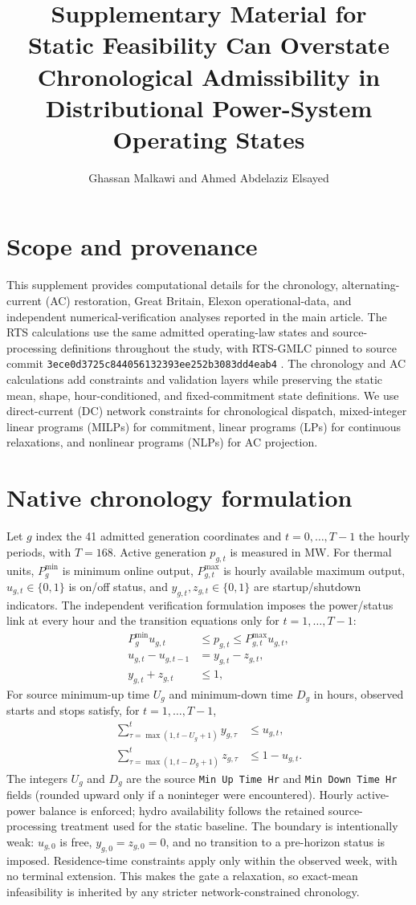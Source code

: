 \documentclass[10pt,journal,onecolumn]{IEEEtran}
\title{Supplementary Material for\\Static Feasibility Can Overstate Chronological Admissibility in Distributional Power-System Operating States}
\author{Ghassan Malkawi and Ahmed Abdelaziz Elsayed}
\begin{document}
\maketitle

\section{Scope and provenance}
This supplement provides computational details for the chronology, alternating-current (AC) restoration, Great Britain, Elexon operational-data, and independent numerical-verification analyses reported in the main article. The RTS calculations use the same admitted operating-law states and source-processing definitions throughout the study, with RTS-GMLC pinned to source commit \texttt{3ece0d3725c844056132393ee252b3083dd4eab4} \cite{Barrows2020,RTSRepo}. The chronology and AC calculations add constraints and validation layers while preserving the static mean, shape, hour-conditioned, and fixed-commitment state definitions. We use direct-current (DC) network constraints for chronological dispatch, mixed-integer linear programs (MILPs) for commitment, linear programs (LPs) for continuous relaxations, and nonlinear programs (NLPs) for AC projection.

\section{Native chronology formulation}
Let $g$ index the 41 admitted generation coordinates and $t=0,\ldots,T-1$ the hourly periods, with $T=168$. Active generation $p_{g,t}$ is measured in MW. For thermal units, $P_g^{\min}$ is minimum online output, $P_{g,t}^{\max}$ is hourly available maximum output, $u_{g,t}\in\{0,1\}$ is on/off status, and $y_{g,t},z_{g,t}\in\{0,1\}$ are startup/shutdown indicators. The independent verification formulation imposes the power/status link at every hour and the transition equations only for $t=1,\ldots,T-1$:
\begin{align}
P_g^{\min}u_{g,t}&\le p_{g,t}\le P_{g,t}^{\max}u_{g,t},\\
u_{g,t}-u_{g,t-1}&=y_{g,t}-z_{g,t},\\
y_{g,t}+z_{g,t}&\le1,
\end{align}
For source minimum-up time $U_g$ and minimum-down time $D_g$ in hours, observed starts and stops satisfy, for $t=1,\ldots,T-1$,
\begin{align}
\sum_{\tau=\max(1,t-U_g+1)}^{t} y_{g,\tau}&\le u_{g,t},\\
\sum_{\tau=\max(1,t-D_g+1)}^{t} z_{g,\tau}&\le 1-u_{g,t}.
\end{align}
The integers $U_g$ and $D_g$ are the source \texttt{Min Up Time Hr} and \texttt{Min Down Time Hr} fields (rounded upward only if a noninteger were encountered). Hourly active-power balance is enforced; hydro availability follows the retained source-processing treatment used for the static baseline. The boundary is intentionally weak: $u_{g,0}$ is free, $y_{g,0}=z_{g,0}=0$, and no transition to a pre-horizon status is imposed. Residence-time constraints apply only within the observed week, with no terminal extension. This makes the gate a relaxation, so exact-mean infeasibility is inherited by any stricter network-constrained chronology.
\end{document}

